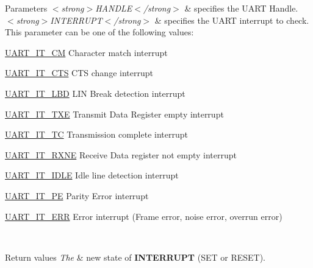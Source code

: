 \begin{DoxyParams}{Parameters}
{\em $<$strong$>$\+H\+A\+N\+D\+L\+E$<$/strong$>$} & specifies the U\+A\+RT Handle. \\
\hline
{\em $<$strong$>$\+I\+N\+T\+E\+R\+R\+U\+P\+T$<$/strong$>$} & specifies the U\+A\+RT interrupt to check. This parameter can be one of the following values\+: \begin{DoxyItemize}
\item \mbox{\hyperlink{group___u_a_r_t___interrupt__definition_ga4c22e866bce68975a180828012489106}{U\+A\+R\+T\+\_\+\+I\+T\+\_\+\+CM}} Character match interrupt \item \mbox{\hyperlink{group___u_a_r_t___interrupt__definition_ga986d271478550f9afa918262ca642333}{U\+A\+R\+T\+\_\+\+I\+T\+\_\+\+C\+TS}} C\+TS change interrupt \item \mbox{\hyperlink{group___u_a_r_t___interrupt__definition_gabca5e77508dc2dd9aa26fcb683d9b988}{U\+A\+R\+T\+\_\+\+I\+T\+\_\+\+L\+BD}} L\+IN Break detection interrupt \item \mbox{\hyperlink{group___u_a_r_t___interrupt__definition_ga552636e2af516d578856f5ee2ba71ed7}{U\+A\+R\+T\+\_\+\+I\+T\+\_\+\+T\+XE}} Transmit Data Register empty interrupt \item \mbox{\hyperlink{group___u_a_r_t___interrupt__definition_gab9a4dc4e8cea354fd60f4117513b2004}{U\+A\+R\+T\+\_\+\+I\+T\+\_\+\+TC}} Transmission complete interrupt \item \mbox{\hyperlink{group___u_a_r_t___interrupt__definition_gac1bedf7a65eb8c3f3c4b52bdb24b139d}{U\+A\+R\+T\+\_\+\+I\+T\+\_\+\+R\+X\+NE}} Receive Data register not empty interrupt \item \mbox{\hyperlink{group___u_a_r_t___interrupt__definition_ga9781808d4f9999061fc2da36572191d9}{U\+A\+R\+T\+\_\+\+I\+T\+\_\+\+I\+D\+LE}} Idle line detection interrupt \item \mbox{\hyperlink{group___u_a_r_t___interrupt__definition_ga55f922ddcf513509710ade5d7c40a1db}{U\+A\+R\+T\+\_\+\+I\+T\+\_\+\+PE}} Parity Error interrupt \item \mbox{\hyperlink{group___u_a_r_t___interrupt__definition_ga8eb26d8edd9bf78ae8d3ad87dd51b618}{U\+A\+R\+T\+\_\+\+I\+T\+\_\+\+E\+RR}} Error interrupt (Frame error, noise error, overrun error) \end{DoxyItemize}
\\
\hline
\end{DoxyParams}

\begin{DoxyRetVals}{Return values}
{\em The} & new state of {\bfseries{I\+N\+T\+E\+R\+R\+U\+PT}} (S\+ET or R\+E\+S\+ET). \\
\hline
\end{DoxyRetVals}
\mbox{\label{group___u_a_r_t___exported___macros_gab53dbf1d75f241330428bf426b2963d1}} 

